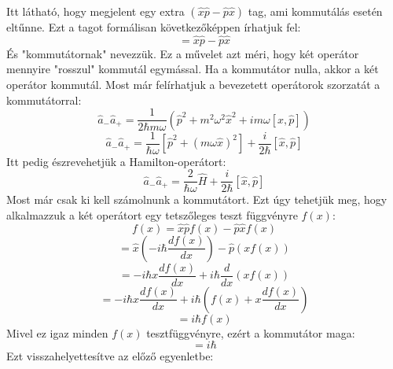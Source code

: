 \documentclass[a4paper,12pt]{article}
\begin{document}
Itt látható, hogy megjelent egy extra $(\hat{x} \hat{p} - \hat{p} \hat{x})$ tag, ami kommutálás esetén eltűnne.
Ezt a tagot formálisan következőképpen írhatjuk fel:
\begin{equation}
    [\hat{x}, \hat{p}] = \hat{x} \hat{p} - \hat{p} \hat{x}
\end{equation}
És "kommutátornak" nevezzük. Ez a művelet azt méri, hogy két operátor mennyire "rosszul" kommutál egymással. Ha a kommutátor nulla, akkor a két operátor kommutál.
Most már felírhatjuk a bevezetett operátorok szorzatát a kommutátorral:
\begin{equation}
    \hat{a}_- \hat{a}_+ = \frac{1}{2 \hbar m \omega} \left( \hat{p}^2 + m^2 \omega^2 \hat{x}^2 + i m \omega [\hat{x}, \hat{p}] \right)
\end{equation}
\begin{equation}
    \hat{a}_- \hat{a}_+ = \frac{1}{\hbar \omega} \left[\hat{p}^2 + (m \omega \hat{x})^2\right] + \frac{i}{2 \hbar} [\hat{x}, \hat{p}]
\end{equation}
Itt pedig észrevehetjük a Hamilton-operátort:
\begin{equation}
    \hat{a}_- \hat{a}_+ = \frac{2}{\hbar \omega} \hat{H} + \frac{i}{2 \hbar} [\hat{x}, \hat{p}]
\end{equation}
Most már csak ki kell számolnunk a kommutátort. Ezt úgy tehetjük meg, hogy alkalmazzuk a két operátort egy tetszőleges teszt függvényre $f(x)$:
\begin{equation}
    [\hat{x}, \hat{p}] f(x) = \hat{x} \hat{p} f(x) - \hat{p} \hat{x} f(x)
\end{equation}
\begin{equation}
    = \hat{x} \left( - i \hbar \frac{d f(x)}{dx} \right) - \hat{p} \left( x f(x) \right)
\end{equation}
\begin{equation}
    = - i \hbar x \frac{d f(x)}{dx} + i \hbar \frac{d}{dx} \left( x f(x) \right)
\end{equation}
\begin{equation}
    = - i \hbar x \frac{d f(x)}{dx} + i \hbar \left( f(x) + x \frac{d f(x)}{dx} \right)
\end{equation}
\begin{equation}
    = i \hbar f(x)
\end{equation}
Mivel ez igaz minden $f(x)$ tesztfüggvényre, ezért a kommutátor maga:
\begin{equation}
    [\hat{x}, \hat{p}] = i \hbar
\end{equation}
Ezt visszahelyettesítve az előző egyenletbe:
\end{document}
